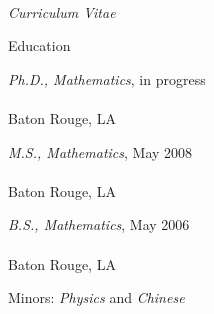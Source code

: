 \documentclass[10pt]{article}
\newenvironment{sublist}{%
	\begin{list}{}{%
		\setlength{\itemsep}{0em}\setlength{\parsep}{0em}%
		\setlength{\topsep}{0em}\setlength{\parskip}{0em}%
	}%
}%
{ \end{list} }
\begin{document}
\begin{cv}{\name\\{\large \itshape Curriculum Vitae}}
\begin{cvlist}{Education}
	\item \emph{Ph.D., Mathematics}, in progress\\
	\institute\\
	Baton Rouge, LA
	\item \emph{M.S., Mathematics}, May 2008\\ 
	\institute\\
	Baton Rouge, LA
	\item \emph{B.S., Mathematics}, May 2006\\
	\institute\\
	Baton Rouge, LA
	\begin{sublist}
		\item Minors: \emph{Physics} and \emph{Chinese}
	\end{sublist}
\end{cvlist}



\end{cv}
\end{document}

